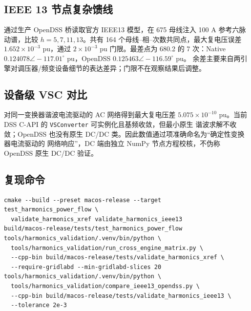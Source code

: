 \subsection{IEEE 13 节点复杂馈线}
 通过生产 OpenDSS 桥读取官方 IEEE13 模型，在 675 母线注入
100 A 参考六脉动谱，比较 $h=5,7,11,13$。共有 164 个母线--相--次数共同点，最大复电压误差
$1.652\times10^{-3}$ pu，通过 $2\times10^{-3}$ pu 门限。最差点为 680.2 的 7 次：Native
$0.124078\angle-117.01^\circ$ pu，OpenDSS $0.125463\angle-116.59^\circ$ pu。
余差主要来自两引擎对调压器/频变设备细节的表达差异；门限不在观察结果后调整。

\subsection{设备级 VSC 对比}
 对同一变换器谐波电流驱动的 AC 网络得到最大复电压差
$5.075\times10^{-10}$ pu。当前 DSS C-API 的 \texttt{VSConverter} 可实例化且基频收敛，但最小原生
谐波求解不收敛；OpenDSS 也没有原生 DC/DC 类。因此数值通过项准确命名为“确定性变换器电流驱动的
网络响应”，DC 端由独立 NumPy 节点方程校核，不伪称 OpenDSS 原生 DC/DC 验证。

\subsection{复现命令}
\begin{verbatim}
cmake --build --preset macos-release --target test_harmonics_power_flow \
  validate_harmonics_xref validate_harmonics_ieee13
build/macos-release/tests/test_harmonics_power_flow
tools/harmonics_validation/.venv/bin/python \
  tools/harmonics_validation/run_cross_engine_matrix.py \
  --cpp-bin build/macos-release/tests/validate_harmonics_xref \
  --require-gridlabd --min-gridlabd-slices 20
tools/harmonics_validation/.venv/bin/python \
  tools/harmonics_validation/compare_ieee13_opendss.py \
  --cpp-bin build/macos-release/tests/validate_harmonics_ieee13 \
  --tolerance 2e-3
\end{verbatim}

